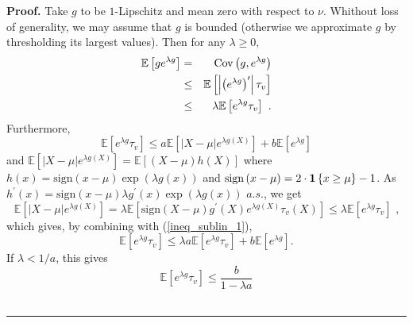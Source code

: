 \documentclass[11pt]{article}
\newenvironment{proof}[1][Proof]{\noindent\textbf{#1.} }{\ \rule{0.5em}{0.5em}}
\DeclareMathOperator{\cov}{Cov}
\begin{document}
\begin{proof}
Take $g$ to be $1$-Lipschitz and mean zero with respect to $\nu $. Whithout
loss of generality, we may assume that $g$ is bounded (otherwise we
approximate $g$ by thresholding its largest values). Then for any $\lambda
\geq 0$,%
\begin{eqnarray}
\mathbb{E}\left[ ge^{\lambda g}\right] &=&%
\cov%
\left( g,e^{\lambda g}\right)  \notag \\
&\leq &\mathbb{E}\left[ \left\vert \left( e^{\lambda g}\right) ^{\prime
}\right\vert \tau _{v}\right]  \notag \\
&\leq &\lambda \mathbb{E}\left[ e^{\lambda g}\tau _{v}\right] \text{ .}
\label{ineq_1}
\end{eqnarray}%
Furthermore,%
\begin{equation}
\mathbb{E}\left[ e^{\lambda g}\tau _{v}\right] \leq a\mathbb{E}\left[
\left\vert X-\mu \right\vert e^{\lambda g\left( X\right) }\right] +b\mathbb{E%
}\left[ e^{\lambda g}\right]  \label{ineq_sublin_1}
\end{equation}%
and $\mathbb{E}\left[ \left\vert X-\mu \right\vert e^{\lambda g\left(
X\right) }\right] =\mathbb{E}\left[ \left( X-\mu \right) h\left( X\right) %
\right] $ where $h\left( x\right) =\mathrm{\mathrm{sign}}\left( x-\mu
\right) \exp \left( \lambda g\left( x\right) \right) $ and $\mathrm{\mathrm{%
sign}}\left( x-\mu \right) =2\cdot \mathbf{1}\left\{ x\geq \mu \right\} -1$.
As $h^{\prime }\left( x\right) =\mathrm{\mathrm{sign}}\left( x-\mu \right)
\lambda g^{\prime }\left( x\right) \exp \left( \lambda g\left( x\right)
\right) $ $a.s.$, we get%
\begin{equation*}
\mathbb{E}\left[ \left\vert X-\mu \right\vert e^{\lambda g\left( X\right) }%
\right] =\lambda \mathbb{E}\left[ \mathrm{\mathrm{sign}}\left( X-\mu \right)
g^{\prime }\left( X\right) e^{\lambda g\left( X\right) }\tau _{v}\left(
X\right) \right] \leq \lambda \mathbb{E}\left[ e^{\lambda g}\tau _{v}\right] 
\text{ ,}
\end{equation*}%
which gives, by combining with (\ref{ineq_sublin_1}),%
\begin{equation*}
\mathbb{E}\left[ e^{\lambda g}\tau _{v}\right] \leq \lambda a\mathbb{E}\left[
e^{\lambda g}\tau _{v}\right] +b\mathbb{E}\left[ e^{\lambda g}\right] \text{
.}
\end{equation*}%
If $\lambda <1/a$, this gives%
\begin{equation}
\mathbb{E}\left[ e^{\lambda g}\tau _{v}\right] \leq \frac{b}{1-\lambda a}%

\end{equation}
\end{proof}
\end{document}

